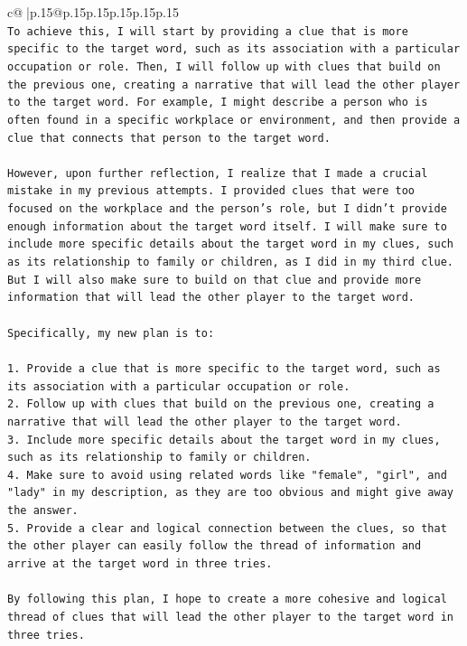 \documentclass{article}
\begin{document}
{\begin{supertabular}{c@{$\;$}|p{.15\linewidth}@{}p{.15\linewidth}p{.15\linewidth}p{.15\linewidth}p{.15\linewidth}p{.15\linewidth}}
{{{\\ 
\texttt{To achieve this, I will start by providing a clue that is more specific to the target word, such as its association with a particular occupation or role. Then, I will follow up with clues that build on the previous one, creating a narrative that will lead the other player to the target word. For example, I might describe a person who is often found in a specific workplace or environment, and then provide a clue that connects that person to the target word.} \\
\\ 
\texttt{However, upon further reflection, I realize that I made a crucial mistake in my previous attempts. I provided clues that were too focused on the workplace and the person's role, but I didn't provide enough information about the target word itself. I will make sure to include more specific details about the target word in my clues, such as its relationship to family or children, as I did in my third clue. But I will also make sure to build on that clue and provide more information that will lead the other player to the target word.} \\
\\ 
\texttt{Specifically, my new plan is to:} \\
\\ 
\texttt{1. Provide a clue that is more specific to the target word, such as its association with a particular occupation or role.} \\
\texttt{2. Follow up with clues that build on the previous one, creating a narrative that will lead the other player to the target word.} \\
\texttt{3. Include more specific details about the target word in my clues, such as its relationship to family or children.} \\
\texttt{4. Make sure to avoid using related words like "female", "girl", and "lady" in my description, as they are too obvious and might give away the answer.} \\
\texttt{5. Provide a clear and logical connection between the clues, so that the other player can easily follow the thread of information and arrive at the target word in three tries.} \\
\\ 
\texttt{By following this plan, I hope to create a more cohesive and logical thread of clues that will lead the other player to the target word in three tries.} \\
\\ 
}}}
\end{supertabular}}
\end{document}
